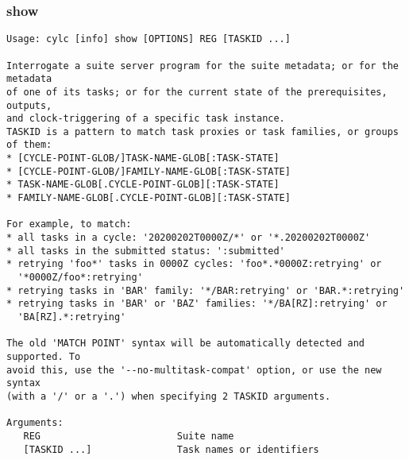 \subsubsection{show}
\label{show}
\begin{lstlisting}
Usage: cylc [info] show [OPTIONS] REG [TASKID ...] 

Interrogate a suite server program for the suite metadata; or for the metadata
of one of its tasks; or for the current state of the prerequisites, outputs,
and clock-triggering of a specific task instance.
TASKID is a pattern to match task proxies or task families, or groups of them:
* [CYCLE-POINT-GLOB/]TASK-NAME-GLOB[:TASK-STATE]
* [CYCLE-POINT-GLOB/]FAMILY-NAME-GLOB[:TASK-STATE]
* TASK-NAME-GLOB[.CYCLE-POINT-GLOB][:TASK-STATE]
* FAMILY-NAME-GLOB[.CYCLE-POINT-GLOB][:TASK-STATE]

For example, to match:
* all tasks in a cycle: '20200202T0000Z/*' or '*.20200202T0000Z'
* all tasks in the submitted status: ':submitted'
* retrying 'foo*' tasks in 0000Z cycles: 'foo*.*0000Z:retrying' or
  '*0000Z/foo*:retrying'
* retrying tasks in 'BAR' family: '*/BAR:retrying' or 'BAR.*:retrying'
* retrying tasks in 'BAR' or 'BAZ' families: '*/BA[RZ]:retrying' or
  'BA[RZ].*:retrying'

The old 'MATCH POINT' syntax will be automatically detected and supported. To
avoid this, use the '--no-multitask-compat' option, or use the new syntax
(with a '/' or a '.') when specifying 2 TASKID arguments.

Arguments:
   REG                        Suite name
   [TASKID ...]               Task names or identifiers


\end{lstlisting}
